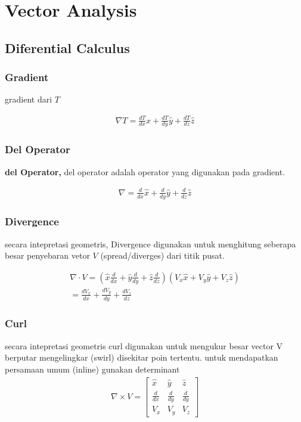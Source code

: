
\graphicspath{{./img/}}


\section{Vector Analysis}
\subsection{Diferential Calculus}

\subsubsection{Gradient}

gradient dari $T$ 

\begin{gather}
  \nabla T = \displaystyle\frac{dT }{dx} \hat{x} + \frac{dT }{dy} \hat{y} + \frac{dT }{dz} \hat{z}
\end{gather}

\subsubsection{Del Operator}
\textbf{del Operator,} del operator adalah operator yang digunakan pada gradient.

\begin{gather}
  \nabla = \displaystyle \frac{d}{dx} \hat{x} + \frac{d}{dy} \hat{y} + \frac{d}{dz} \hat{z}
\end{gather}


\subsubsection{Divergence}
secara intepretasi geometris, Divergence digunakan untuk menghitung seberapa besar penyebaran vetor $V$ (spread/diverges)
dari titik pusat.

\begin{gather}
  \nabla \cdot V = (\hat{x} \frac{d}{dx} + \hat{y} \frac{d}{dy} + \hat{z} \frac{d}{dz} ) (V_x \hat{x} + V_y \hat{y} + V_z \hat{z}) \\
  = \frac{dV_x}{dx} + \frac{dV_y}{dy} + \frac{dV_z}{dz} 
\end{gather}


\subsubsection{Curl}
secara intepretasi geometris curl digunakan untuk mengukur besar vector V berputar mengelingkar (swirl) disekitar poin tertentu.
untuk mendapatkan persamaan umum (inline) gunakan determinant
\begin{gather}
  \nabla \times V = 
  \begin{bmatrix}
    \hat{x}      & \hat{y}      & \hat{z} \\
    \frac{d}{dx} & \frac{d}{dy} & \frac{d}{dy} \\
    V_x & V_y & V_z
  \end{bmatrix}
\end{gather}


